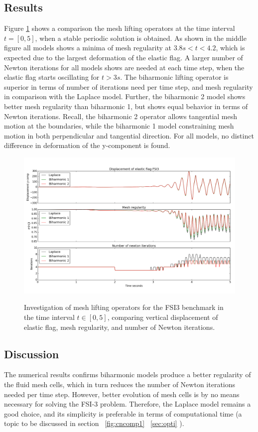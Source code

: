 \subsection*{Results}
Figure \ref{fig:minjcomp} shows a comparison the mesh lifting operators at the time interval $t = [0, 5]$, when a stable periodic solution is obtained. As shown in the middle figure all models shows a minima of mesh regularity at $3.8s < t < 4.2$, which is expected due to the largest deformation of the elastic flag. A larger number of Newton iterations for all models shows are needed at each time step, when the elastic flag starts oscillating for $t > 3s$. The biharmonic lifting operator is superior in terms of number of iterations need per time step, and mesh regularity in comparison with the Laplace model. Further, the biharmonic 2 model shows better mesh regularity than biharmonic 1, but shows equal behavior in terms of Newton iterations. Recall, the biharmonic 2 operator allows tangential mesh motion at the boundaries, while the biharmonic 1 model constraining mesh motion in both perpendicular and tangential direction. For all models, no distinct difference in deformation of the y-component is found.
\begin{figure}[h!]
        \centering
    \includegraphics[scale=0.4]{./Fig/minjcompare.png} \\
      \caption{Investigation of mesh lifting operators for the FSI3 benchmark in the time interval $t \in [0, 5]$, comparing vertical displacement of elastic flag, mesh regularity, and number of Newton iterations.}
      \label{fig:minjcomp}
\end{figure}
\subsection*{Discussion}
The numerical results confirms biharmonic models produce a better regularity of the fluid mesh cells, which in turn reduces the number of Newton iterations needed per time step. However, better evolution of mesh cells is by no means necessary for solving the FSI-3 problem. Therefore, the Laplace model remains a good choice, and its simplicity is preferable in terms of computational time (a topic to be discussed in section ~\ref{fig:cncomp1} 
~\ref{sec:opti} ).
\newpage
